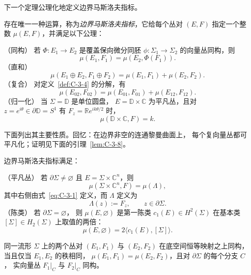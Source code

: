 下一个定理公理化地定义边界马斯洛夫指标。

\begin{theorem}\label{thm:C-3-5}
存在唯一一种运算，称为\emph{边界马斯洛夫指标}，它给每个丛对 $(E,F)$
指定一个整数 $\mu(E,F)$，并满足以下公理：

\noindent\textup{（同构）} 若 $\Phi:E_1\to E_2$ 是覆盖保向微分同胚
$\phi:\Sigma_1\to\Sigma_2$ 的向量丛同构，则
\[
  \mu(E_1,F_1)=\mu(E_2,\Phi(F_1)).
\]
\noindent\textup{（直和）}
\[
  \mu(E_1\oplus E_2,F_1\oplus F_2)=\mu(E_1,F_1)+\mu(E_2,F_2).
\]
\noindent\textup{（复合）} 对定义~\ref{def:C-3-4} 的分解，有
\[
  \mu(E_{02},F_{02})=\mu(E_{01},F_{01})+\mu(E_{12},F_{12}).
\]
\noindent\textup{（归一化）} 当 $\Sigma=\mathbb D$ 是单位圆盘，
$E=\mathbb D\times\mathbb C$ 为平凡丛，且对
$z=e^{i\theta}\in\partial\mathbb D=S^1$ 有
$F_z=\mathbb R e^{ik\theta/2}$ 时，
\[
  \mu(\mathbb D\times\mathbb C,F)=k.
\]
\end{theorem}

下面列出其主要性质。回忆：在边界非空的连通黎曼曲面上，
每个复向量丛都可平凡化；证明见下面的引理~\ref{lem:C-3-8}。

\begin{theorem}\label{thm:C-3-6}
边界马斯洛夫指标满足：

\noindent\textup{（平凡丛）} 若 $\partial\Sigma\ne\varnothing$ 且
$E=\Sigma\times\mathbb C^n$，则
\begin{equation}\label{eq:C-3-2}
  \mu(\Sigma\times\mathbb C^n,F)=\mu(\Lambda),
\end{equation}
其中右侧由式~\eqref{eq:C-3-1} 定义，而 $\Lambda$ 定义为
\begin{equation}\label{eq:C-3-3}
  \Lambda(z):=F_z,\qquad z\in\partial\Sigma.
\end{equation}
\noindent\textup{（陈类）} 若 $\partial\Sigma=\varnothing$，
则 $\mu(E,\varnothing)$ 是第一陈类 $c_1(E)\in H^2(\Sigma)$
在基本类 $[\Sigma]\in H_2(\Sigma)$ 上取值的两倍：
\begin{equation}\label{eq:C-3-4}
  \mu(E,\varnothing)=2\langle c_1(E),[\Sigma]\rangle.
\end{equation}
\end{theorem}

\begin{theorem}\label{thm:C-3-7}
同一流形 $\Sigma$ 上的两个丛对 $(E_1,F_1)$ 与 $(E_2,F_2)$
在底空间恒等映射之上同构，当且仅当 $E_1,E_2$ 的秩相同，
$\mu(E_1,F_1)=\mu(E_2,F_2)$，且对 $\partial\Sigma$ 的每个分支 $C$，
实向量丛 $F_1|_C$ 与 $F_2|_C$ 同构。
\end{theorem}

